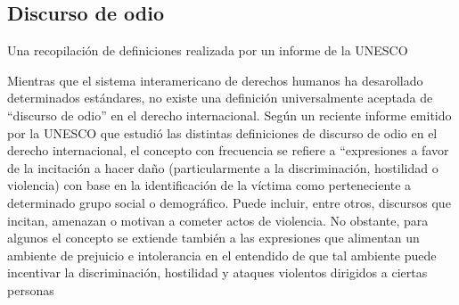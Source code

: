 \subsection{Discurso de odio}

Una recopilación de definiciones realizada por un informe de la UNESCO

\begin{displayquote}
    Mientras que el sistema interamericano de derechos humanos ha desarollado determinados estándares, no existe una definición universalmente aceptada de “discurso de odio” en el derecho internacional. Según un reciente informe emitido por la UNESCO que estudió las distintas definiciones de discurso de odio en el derecho internacional, el concepto con frecuencia se refiere a “expresiones a favor de la incitación a hacer daño (particularmente a la discriminación, hostilidad o violencia) con base en la identificación de la víctima como perteneciente a determinado grupo social o demográfico. Puede incluir, entre otros, discursos que incitan, amenazan o motivan a cometer actos de violencia. No obstante, para algunos el concepto se extiende también a las expresiones que alimentan un ambiente de prejuicio e intolerancia en el entendido de que tal ambiente puede incentivar la discriminación, hostilidad y ataques violentos dirigidos a ciertas personas
\end{displayquote}

